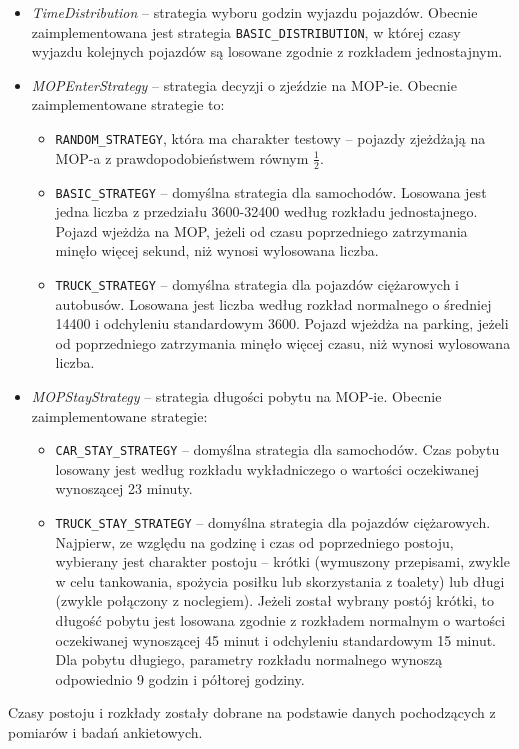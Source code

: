 \begin{itemize}
\item \textit{TimeDistribution} -- strategia wyboru godzin wyjazdu pojazdów. Obecnie zaimplementowana jest strategia \texttt{BASIC\_DISTRIBUTION}, w której czasy wyjazdu kolejnych pojazdów są losowane zgodnie z rozkładem jednostajnym.
\item \textit{MOPEnterStrategy} -- strategia decyzji o zjeździe na MOP-ie. Obecnie zaimplementowane strategie to:
\begin{itemize}
    \item \texttt{RANDOM\_STRATEGY}, która ma charakter testowy -- pojazdy zjeżdżają na MOP-a z prawdopodobieństwem równym $\frac{1}{2}$.
    \item \texttt{BASIC\_STRATEGY} -- domyślna strategia dla samochodów. Losowana jest jedna liczba z przedziału 3600-32400 według rozkładu jednostajnego. Pojazd wjeżdża na MOP, jeżeli od czasu poprzedniego zatrzymania minęło więcej sekund, niż wynosi wylosowana liczba.
    \item \texttt{TRUCK\_STRATEGY} -- domyślna strategia dla pojazdów ciężarowych i autobusów. Losowana jest liczba według rozkład normalnego o średniej 14400 i odchyleniu standardowym 3600.  Pojazd wjeżdża na parking, jeżeli od poprzedniego zatrzymania minęło więcej czasu, niż wynosi wylosowana liczba.
\end{itemize}
\item \textit{MOPStayStrategy} -- strategia długości pobytu na MOP-ie. Obecnie zaimplementowane strategie:
\begin{itemize}
    \item \texttt{CAR\_STAY\_STRATEGY} -- domyślna strategia dla samochodów. Czas pobytu losowany jest według rozkładu wykładniczego o wartości oczekiwanej wynoszącej 23 minuty.
    \item \texttt{TRUCK\_STAY\_STRATEGY} -- domyślna strategia dla pojazdów ciężarowych. Najpierw, ze względu na godzinę i czas od poprzedniego postoju, wybierany jest charakter postoju -- krótki (wymuszony przepisami, zwykle w celu tankowania, spożycia posiłku lub skorzystania z toalety) lub długi (zwykle połączony z noclegiem). Jeżeli został wybrany postój krótki, to długość pobytu jest losowana zgodnie z rozkładem normalnym o wartości oczekiwanej wynoszącej 45 minut i odchyleniu standardowym 15 minut. Dla pobytu długiego, parametry rozkładu normalnego wynoszą odpowiednio 9 godzin i półtorej godziny.
\end{itemize}
\end{itemize}
Czasy postoju i rozkłady zostały dobrane na podstawie danych pochodzących z pomiarów i badań ankietowych.

